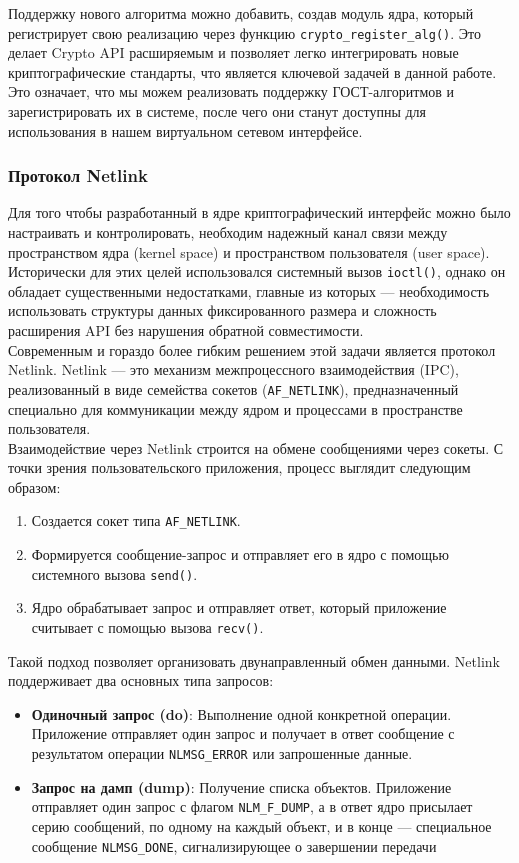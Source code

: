 Поддержку нового алгоритма можно добавить, создав модуль ядра, который регистрирует свою реализацию через функцию \texttt{crypto_register_alg()}.
Это делает Crypto API расширяемым и позволяет легко интегрировать новые криптографические стандарты, что является ключевой задачей в данной работе.
Это означает, что мы можем реализовать поддержку ГОСТ-алгоритмов и зарегистрировать их в системе, после чего они станут доступны для использования в нашем виртуальном сетевом интерфейсе.

\subsubsection{Протокол Netlink}
Для того чтобы разработанный в ядре криптографический интерфейс можно было настраивать и контролировать, необходим надежный канал связи между пространством ядра (kernel space) и пространством пользователя (user space).
Исторически для этих целей использовался системный вызов \texttt{ioctl()}, однако он обладает существенными недостатками, главные из которых — необходимость использовать структуры данных фиксированного размера и сложность расширения API без нарушения обратной совместимости. \\

Современным и гораздо более гибким решением этой задачи является протокол Netlink.
Netlink — это механизм межпроцессного взаимодействия (IPC), реализованный в виде семейства сокетов (\texttt{AF_NETLINK}), предназначенный специально для коммуникации между ядром и процессами в пространстве пользователя.~\cite{netlink_doc} \\

Взаимодействие через Netlink строится на обмене сообщениями через сокеты.
С точки зрения пользовательского приложения, процесс выглядит следующим образом:
\begin{enumerate}
    \item Создается сокет типа \texttt{AF_NETLINK}.
    \item Формируется сообщение-запрос и отправляет его в ядро с помощью системного вызова \texttt{send()}.
    \item Ядро обрабатывает запрос и отправляет ответ, который приложение считывает с помощью вызова \texttt{recv()}.
\end{enumerate}

Такой подход позволяет организовать двунаправленный обмен данными.
Netlink поддерживает два основных типа запросов:
\begin{itemize}
    \item \textbf{Одиночный запрос (do)}:
    Выполнение одной конкретной операции.
    Приложение отправляет один запрос и получает в ответ сообщение с результатом операции \texttt{NLMSG_ERROR} или запрошенные данные.
    \item \textbf{Запрос на дамп (dump)}:
    Получение списка объектов.
    Приложение отправляет один запрос с флагом \texttt{NLM_F_DUMP}, а в ответ ядро присылает серию сообщений, по одному на каждый объект, и в конце — специальное сообщение \texttt{NLMSG_DONE}, сигнализирующее о завершении передачи
\end{itemize}

